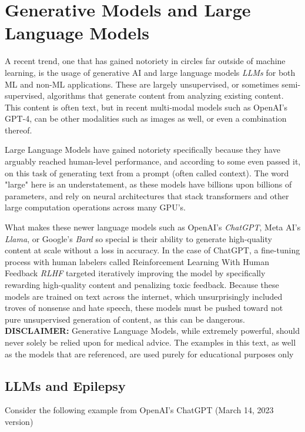 
\section{Generative Models and Large Language Models}

A recent trend, one that has gained notoriety in circles far outside of machine learning, is the usage of generative AI
and large language models \textit{LLMs} for both ML and non-ML applications. These are largely unsupervised, or sometimes
semi-supervised, algorithms that generate content from analyzing existing content. This content is often text, but in recent
multi-modal models such as OpenAI's GPT-4\cite{openai2023gpt4}, can be other modalities such as images as well, or  even a combination thereof.

Large Language Models have gained notoriety specifically because they have arguably reached human-level performance, and according
to some even passed it, on this task of generating text from a prompt (often called context). The word "large" here is an understatement,
as these models have billions upon billions of parameters, and rely on neural architectures that stack transformers and other large
computation operations across many GPU's.

What makes these newer language models such as OpenAI's \textit{ChatGPT}, Meta AI's \textit{Llama}, or Google's \textit{Bard} so special
is their ability to generate high-quality content at scale without a loss in accuracy. In the case of ChatGPT, a fine-tuning process with
human labelers called Reinforcement Learning With Human Feedback \textit{RLHF} targeted iteratively improving the model by specifically
rewarding high-quality content and penalizing toxic feedback. Because these models are trained on text across the internet, which
unsurprisingly included troves of nonsense and hate speech, these models must be pushed toward not pure unsupervised generation of content,
as this can be dangerous.
\\
\textbf{DISCLAIMER:} Generative Language Models, while extremely powerful, should never solely be relied upon for medical advice. The examples in this text,
as well as the models that are referenced, are used purely for educational purposes only

\subsection{LLMs and Epilepsy}

Consider the following example from OpenAI's ChatGPT (March 14, 2023 version)

